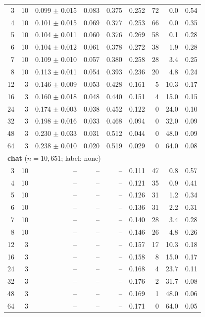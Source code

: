 \begin{longtable}{rrrrrrrrr}
\midrule
3 & 10 & 0.099 $\pm$ 0.015 & 0.083 & 0.375 & 0.252 & 72 & 0.0 & 0.54 \\
4 & 10 & 0.101 $\pm$ 0.015 & 0.069 & 0.377 & 0.253 & 66 & 0.0 & 0.35 \\
5 & 10 & 0.104 $\pm$ 0.011 & 0.060 & 0.376 & 0.269 & 58 & 0.1 & 0.28 \\
6 & 10 & 0.104 $\pm$ 0.012 & 0.061 & 0.378 & 0.272 & 38 & 1.9 & 0.28 \\
7 & 10 & 0.109 $\pm$ 0.010 & 0.057 & 0.380 & 0.258 & 28 & 3.4 & 0.25 \\
8 & 10 & 0.113 $\pm$ 0.011 & 0.054 & 0.393 & 0.236 & 20 & 4.8 & 0.24 \\
12 & 3 & 0.146 $\pm$ 0.009 & 0.053 & 0.428 & 0.161 & 5 & 10.3 & 0.17 \\
16 & 3 & 0.160 $\pm$ 0.018 & 0.048 & 0.440 & 0.151 & 4 & 15.0 & 0.15 \\
24 & 3 & 0.174 $\pm$ 0.003 & 0.038 & 0.452 & 0.122 & 0 & 24.0 & 0.10 \\
32 & 3 & 0.198 $\pm$ 0.016 & 0.033 & 0.468 & 0.094 & 0 & 32.0 & 0.09 \\
48 & 3 & 0.230 $\pm$ 0.033 & 0.031 & 0.512 & 0.044 & 0 & 48.0 & 0.09 \\
64 & 3 & 0.238 $\pm$ 0.010 & 0.020 & 0.519 & 0.029 & 0 & 64.0 & 0.08 \\
\midrule
\multicolumn{9}{l}{\textbf{chat} ($n = 10,651$; label: none)} \\
\midrule
3 & 10 & -- & -- & -- & 0.111 & 47 & 0.8 & 0.57 \\
4 & 10 & -- & -- & -- & 0.121 & 35 & 0.9 & 0.41 \\
5 & 10 & -- & -- & -- & 0.126 & 31 & 1.2 & 0.34 \\
6 & 10 & -- & -- & -- & 0.136 & 31 & 2.2 & 0.31 \\
7 & 10 & -- & -- & -- & 0.140 & 28 & 3.4 & 0.28 \\
8 & 10 & -- & -- & -- & 0.146 & 26 & 4.8 & 0.26 \\
12 & 3 & -- & -- & -- & 0.157 & 17 & 10.3 & 0.18 \\
16 & 3 & -- & -- & -- & 0.158 & 8 & 15.0 & 0.17 \\
24 & 3 & -- & -- & -- & 0.168 & 4 & 23.7 & 0.11 \\
32 & 3 & -- & -- & -- & 0.176 & 2 & 31.7 & 0.08 \\
48 & 3 & -- & -- & -- & 0.169 & 1 & 48.0 & 0.06 \\
64 & 3 & -- & -- & -- & 0.171 & 0 & 64.0 & 0.05 \\
\bottomrule
\end{longtable}
